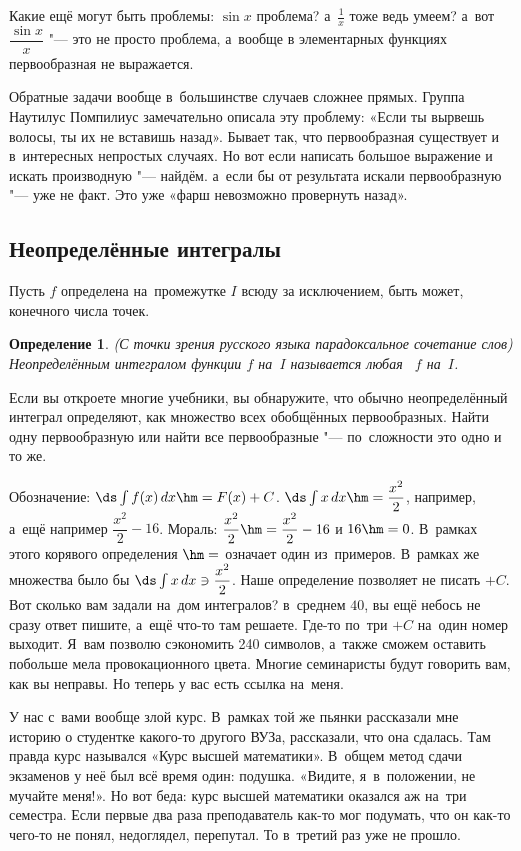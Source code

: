 \documentclass[a4paper,10pt,twoside]{article}
\newtheorem{Def}{Определение}[section]
\begin{document}
Какие ещё могут быть проблемы: $\sin x$ проблема? а~$\frac1x$ тоже ведь умеем? а~вот $\dfrac{\sin x}{x}$ "--- это не просто проблема, а~вообще
в элементарных функциях первообразная не выражается.

Обратные задачи вообще в~большинстве случаев сложнее прямых. Группа Наутилус Помпилиус замечательно описала эту проблему:
«Если ты вырвешь волосы, ты их не вставишь назад». Бывает так, что первообразная существует и в~интересных непростых случаях. Но вот если написать
большое выражение и искать производную "--- найдём. а~если бы от результата искали первообразную "--- уже не факт. Это уже «фарш невозможно провернуть назад».

\subsection{Неопределённые интегралы}

Пусть $f$ определена на~промежутке $I$ всюду за исключением, быть может, конечного числа точек.

\begin{Def}
  (С точки зрения русского языка парадоксальное сочетание слов) Неопределённым интегралом функции $f$ на~$I$ называется любая \op\ $f$ на~$I$.
\end{Def}

Если вы откроете многие учебники, вы обнаружите, что обычно неопределённый интеграл определяют, как множество всех обобщённых первообразных.
Найти одну первообразную или найти все первообразные "--- по~сложности это одно и то же.

Обозначение: $\ds \int f(x)\,dx \hm= F(x)+C$. $\ds\int x\,dx \hm= \dfrac{x^2}2$, например, а~ещё например $\dfrac{x^2}2 - 16$. Мораль:
$\dfrac{x^2}2 \hm= \dfrac{x^2}2 - 16$ и $16\hm=0$. В~рамках этого корявого определения $\hm=$ означает один из~примеров. В~рамках же множества было бы
$\ds\int x\,dx\ni \dfrac{x^2}2$. Наше определение позволяет не писать $+C$. Вот сколько вам задали на~дом интегралов? в~среднем $40$, вы ещё небось
не сразу ответ пишите, а~ещё что-то там решаете. Где-то по~три $+C$ на~один номер выходит. Я~вам позволю сэкономить 240 символов, а~также сможем
оставить побольше мела провокационного цвета. Многие семинаристы будут говорить вам, как вы неправы. Но теперь у вас есть ссылка на~меня.

У нас с~вами вообще злой курс. В~рамках той же пьянки рассказали мне историю о студентке какого-то другого ВУЗа, рассказали, что она сдалась.
Там правда курс назывался «Курс высшей математики». В~общем метод сдачи экзаменов у неё был всё время один: подушка. «Видите, я~в~положении,
не мучайте меня!». Но вот беда: курс высшей математики оказался аж на~три семестра. Если первые два раза преподаватель как-то мог подумать, что
он как-то чего-то не понял, недоглядел, перепутал. То в~третий раз уже не прошло.
\end{document}
